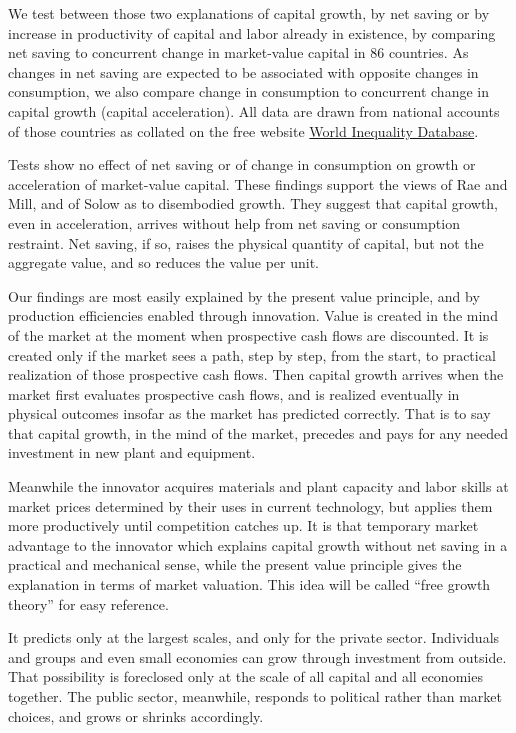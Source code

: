 \documentclass[a4paper,fleqn]{latex_styles/cas-sc}
\begin{document}
We test between those two explanations of capital growth, by net
saving or by increase in productivity of capital and labor already
in existence, by comparing net saving to concurrent change in
market-value capital in 86 countries. As changes in net saving
are expected to be associated with opposite changes in consumption, we
also compare change in consumption to concurrent change in capital
growth (capital acceleration). All data are drawn from national accounts
of those countries as collated on the free website \href{https://wid.world/}{World Inequality Database}.

Tests show no effect of net saving or of change in consumption on
growth or acceleration of market-value capital. These findings support
the views of Rae and Mill, and of Solow as to disembodied growth. They
suggest that capital growth, even in acceleration, arrives without help
from net saving or consumption restraint. Net saving, if so,
raises the physical quantity of capital, but not the aggregate value,
and so reduces the value per unit.

Our findings are most easily explained by the present value principle,
and by production efficiencies enabled through innovation. Value is
created in the mind of the market at the moment when prospective cash
flows are discounted. It is created only if the market sees a path, step
by step, from the start, to practical realization of those prospective
cash flows. Then capital growth arrives when the market first evaluates
prospective cash flows, and is realized eventually in physical outcomes
insofar as the market has predicted correctly. That is to say that capital
growth, in the mind of the market, precedes and pays for any needed investment
in new plant and equipment.

Meanwhile the innovator
acquires materials and plant capacity and labor skills at market prices
determined by their uses in current technology, but applies them more
productively until competition catches up. It is that temporary market
advantage to the innovator which explains capital growth without net
saving in a practical and mechanical sense, while the present value
principle gives the explanation in terms of market valuation. This idea
will be called ``free growth theory'' for easy reference.

It predicts only at the largest scales, and only for the private sector.
Individuals and groups and even small economies can grow through
investment from outside. That possibility is foreclosed only at the
scale of all capital and all economies together. The public sector,
meanwhile, responds to political rather than market choices, and grows
or shrinks accordingly.
\end{document}
